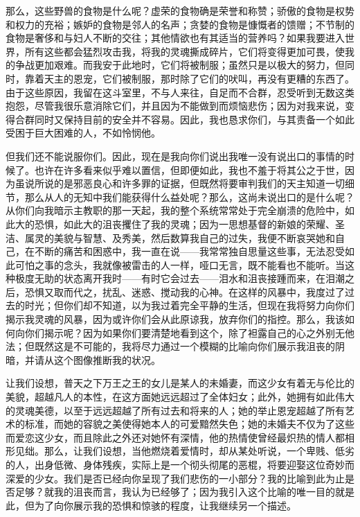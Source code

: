那么，这些野兽的食物是什么呢？虚荣的食物确是荣誉和称赞；骄傲的食物是权势和权力的充裕；嫉妒的食物是邻人的名声；贪婪的食物是慷慨者的馈赠；不节制的食物是奢侈和与妇人不断的交往；其他情欲也有其适当的营养吗？如果我要进入世界，所有这些都会猛烈攻击我，将我的灵魂撕成碎片，它们将变得更加可畏，使我的争战更加艰难。而我安于此地时，它们将被制服；虽然只是以极大的努力，但同时，靠着天主的恩宠，它们被制服，那时除了它们的吠叫，再没有更糟的东西了。由于这些原因，我留在这斗室里，不与人来往，自足而不合群，忍受听到无数这类抱怨，尽管我很乐意消除它们，并且因为不能做到而烦恼悲伤；因为对我来说，变得合群同时又保持目前的安全并不容易。因此，我也恳求你们，与其责备一个如此受困于巨大困难的人，不如怜悯他。\par

但我们还不能说服你们。因此，现在是我向你们说出我唯一没有说出口的事情的时候了。也许在许多看来似乎难以置信，但即便如此，我也不羞于将其公之于世，因为虽说所说的是邪恶良心和许多罪的证据，但既然将要审判我们的天主知道一切细节，那么从人的无知中我们能获得什么益处呢？那么，这尚未说出口的是什么呢？从你们向我暗示主教职的那一天起，我的整个系统常常处于完全崩溃的危险中，如此大的恐惧，如此大的沮丧攫住了我的灵魂；因为一思想基督的新娘的荣耀、圣洁、属灵的美貌与智慧、及秀美，然后数算我自己的过失，我便不断哀哭她和自己，在不断的痛苦和困惑中，我一直在说——我常常独自思量这些事，无法忍受如此可怕之事的念头，我就像被雷击的人一样，哑口无言，既不能看也不能听。当这种极度无助的状态离开我时——有时它会过去——泪水和沮丧接踵而来，在泪潮之后，恐惧又取而代之，扰乱、迷惑、搅动我的心神。在这样的风暴中，我度过了过去的时光；但你们却不知道，以为我过着完全平静的生活，但现在我将努力向你们揭示我灵魂的风暴，因为或许你们会从此原谅我，放弃你们的指控。那么，我该如何向你们揭示呢？因为如果你们要清楚地看到这个，除了袒露自己的心之外别无他法；但既然这是不可能的，我将尽力通过一个模糊的比喻向你们展示我沮丧的阴暗，并请从这个图像推断我的状况。\par

让我们设想，普天之下万王之王的女儿是某人的未婚妻，而这少女有着无与伦比的美貌，超越凡人的本性，在这方面她远远超过了全体妇女；此外，她拥有如此伟大的灵魂美德，以至于远远超越了所有过去和将来的人；她的举止恩宠超越了所有艺术的标准，而她的容貌之美使得她本人的可爱黯然失色；她的未婚夫不仅为了这些而爱恋这少女，而且除此之外还对她怀有深情，他的热情使曾经最炽热的情人都相形见绌。那么，让我们设想，当他燃烧着爱情时，却从某处听说，一个卑贱、低劣的人，出身低微、身体残疾，实际上是一个彻头彻尾的恶棍，将要迎娶这位奇妙而深爱的少女。我们是否已经向你呈现了我们悲伤的一小部分？我的比喻到此为止是否足够？就我的沮丧而言，我认为已经够了；因为我引入这个比喻的唯一目的就是此，但为了向你展示我的恐惧和惊骇的程度，让我继续另一个描述。\par

